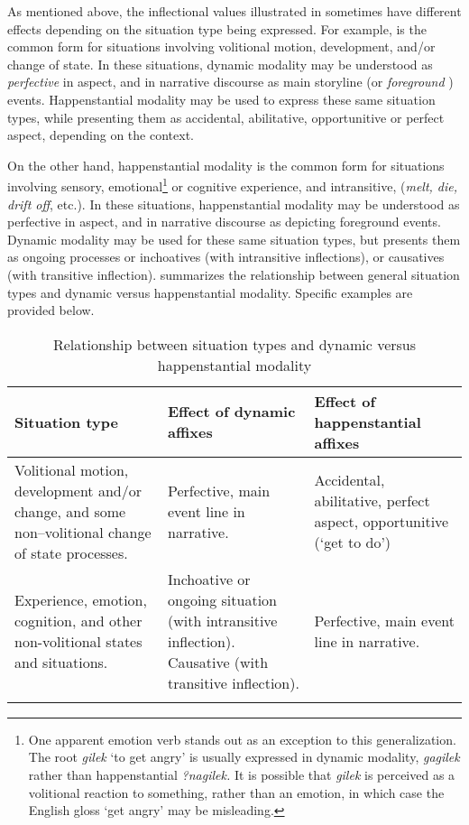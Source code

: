 As mentioned above, the  inflectional values illustrated in  sometimes have different effects depending on the situation type being expressed. For example,  is the common form for situations involving volitional motion, development, and/or change of state. In these situations, dynamic modality may be understood as \textit{perfective} in aspect, and in narrative discourse as main storyline (or \textit{foreground} \citealt{hopper1980}) events. Happenstantial modality may be used to express these same situation types, while presenting them as accidental, abilitative, opportunitive or perfect aspect, depending on the context.

On the other hand, happenstantial modality is the common form for situations involving sensory, emotional\footnote{One apparent emotion verb stands out as an exception to this generalization. The root \textit{gilek} ‘to get angry’ is usually expressed in dynamic modality, \textit{gagilek} rather than happenstantial \textit{?nagilek.} It is possible that \textit{gilek} is perceived as a volitional reaction to something, rather than an emotion, in which case the English gloss ‘get angry’ may be misleading.} or cognitive experience, and intransitive,  (\textit{melt, die, drift off}, etc.). In these situations, happenstantial modality may be understood as perfective in aspect, and in narrative discourse as depicting foreground events. Dynamic modality may be used for these same situation types, but presents them as ongoing processes or inchoatives (with intransitive inflections), or causatives (with transitive inflection).  summarizes the relationship between general situation types and dynamic versus happenstantial modality. Specific examples are provided below.

\begin{table}
\caption{Relationship between situation types and dynamic versus happenstantial modality}
\label{tab:Relationshipbetweensituationtypesanddynamicvshappenstantialmodality}
\begin{tabularx}{\textwidth}{QQQ}
\lsptoprule
Situation type & Effect of dynamic affixes & Effect of happenstantial affixes \\
\midrule
Volitional motion, development and/or change, and some non–volitional change of state processes.  & Perfective, main event line in narrative. & Accidental, abilitative, perfect aspect, opportunitive (‘get to do’) \\
\tablevspace
Experience, emotion, cognition, and other non-volitional states and situations. & Inchoative or ongoing situation (with intransitive inflection). Causative (with transitive inflection). & Perfective, main event line in narrative. \\
\lspbottomrule
\end{tabularx}
\end{table}

